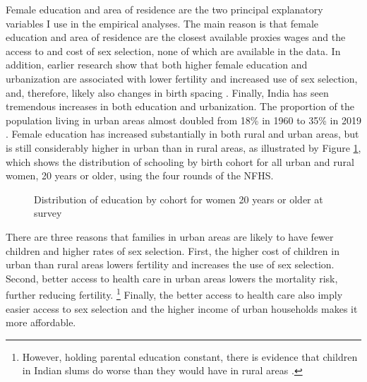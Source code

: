 Female education and area of residence are the two principal explanatory variables I use
in the empirical analyses.
The main reason is that female education and area of residence are the closest 
available proxies wages and the access to and cost of sex selection, none of which are 
available in the data.
In addition, earlier research show that both higher female education and urbanization are 
associated with lower fertility and increased use of sex selection, and, therefore,
likely also changes in birth spacing
\citep{das_gupta97,dreze01,bhat03,retherford03b,Guilmoto2009a,Portner2015b,Jayachandran2017}.
Finally, India has seen tremendous increases in both education and urbanization.
The proportion of the population living in urban areas almost doubled from 18\%
in 1960 to 35\% in 2019 \citep{United-Nations2019}.
Female education has increased substantially in both rural and urban areas,
but is still considerably higher in urban than in rural areas, as illustrated by Figure 
\ref{fig:education_over_time}, which shows the distribution of schooling by birth 
cohort for all urban and rural women, 20 years or older, using the four rounds of the NFHS.

\begin{figure}[htpb]
\centering
{} 
\caption{Distribution of education by cohort for women 20 years or older at survey}
\label{fig:education_over_time}
\end{figure}


There are three reasons that families in urban areas are likely to have fewer children and 
higher rates of sex selection. 
First, the higher cost of children in urban than rural areas lowers fertility and 
increases the use of sex selection.
Second, better access to health care in urban areas lowers the mortality risk, further 
reducing fertility.%
\footnote{
However, holding parental education constant, there is evidence that children in
Indian slums do worse than they would have in rural areas \citep{Portner2018a}.
}
Finally, the better access to health care also imply easier access to sex selection and 
the higher income of urban households makes it more affordable.

